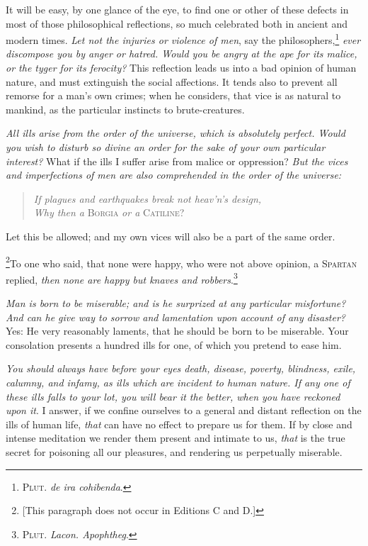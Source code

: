It will be easy, by one glance of the eye, to find one or other of
these defects in most of those philosophical reflections, so much
celebrated both in ancient and modern times. \textit{Let not the
injuries or violence of men}, say the
philosophers,\footnote{\textsc{Plut}. \textit{de ira cohibenda}.}
\textit{ever discompose you by anger or hatred. Would you be angry at
the ape for its malice, or the tyger for its ferocity?} This
reflection leads us into a bad opinion of human nature, and must
extinguish the social affections. It tends also to prevent all remorse
for a man's own crimes; when he considers, that vice is as natural to
mankind, as the particular instincts to brute-creatures.

\textit{All ills arise from the order of the universe, which is
absolutely perfect. Would you wish to disturb so divine an order for
the sake of your own particular interest?} What if the ills I suffer
arise from malice or oppression? \textit{But the vices and 
imperfections of men are also comprehended in the order of the
universe:}

\begin{verse} \textit{If plagues and earthquakes break not heav'n's
design,\\Why then a} \textsc{Borgia} \textit{or a} \textsc{Catiline}?
\end{verse}

\noindent Let this be allowed; and my own vices will also be a part of
the same order.

\footnote{[This paragraph does not occur in Editions C and D.]}To one
who said, that none were happy, who were not above opinion, a
\textsc{Spartan} replied, \textit{then none are happy but knaves and
robbers}.\footnote{\textsc{Plut}. \textit{Lacon. Apophtheg}.}

\textit{Man is born to be miserable; and is he surprized at any
particular misfortune? And can he give way to sorrow and lamentation
upon account of any disaster?} Yes: He very reasonably laments, that
he should be born to be miserable. Your consolation presents a hundred
ills for one, of which you pretend to ease him.

\textit{You should always have before your eyes death, disease,
poverty, blindness, exile, calumny, and infamy, as ills which are
incident to human nature. If any one of these ills falls to your lot,
you will bear it the better, when you have reckoned upon it}. I
answer, if we confine ourselves to a general and distant reflection on
the ills of human life, \textit{that} can have no effect to prepare us
for them. If by close and intense meditation we render them present
and intimate to us, \textit{that} is the true secret for poisoning all
our pleasures, and rendering us perpetually miserable.

